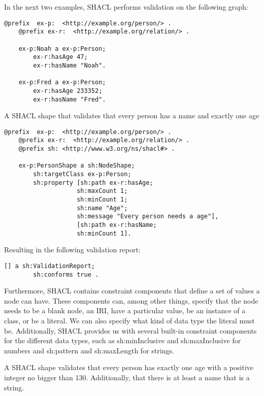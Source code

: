 \para
In the next two examples, SHACL performs validation on the following graph:
\begin{lstlisting}[frame=single, language=turtle, frame=none]
    @prefix  ex-p:  <http://example.org/person/> . 
    @prefix ex-r:  <http://example.org/relation/> . 

    ex-p:Noah a ex-p:Person;
        ex-r:hasAge 47;
        ex-r:hasName "Noah".

    ex-p:Fred a ex-p:Person;
        ex-r:hasAge 233352;
        ex-r:hasName "Fred".
\end{lstlisting}

\begin{example}
A SHACL shape that validates that every person has a name and exactly one age
\end{example}

\begin{lstlisting}[frame=single, language=turtle, frame=none]
    @prefix  ex-p:  <http://example.org/person/> . 
    @prefix ex-r:  <http://example.org/relation/> . 
    @prefix sh:	<http://www.w3.org/ns/shacl#> .

    ex-p:PersonShape a sh:NodeShape;
        sh:targetClass ex-p:Person;
        sh:property [sh:path ex-r:hasAge; 
                    sh:maxCount 1;
                    sh:minCount 1;
                    sh:name "Age";
                    sh:message "Every person needs a age"],
                    [sh:path ex-r:hasName;
                    sh:minCount 1].
\end{lstlisting}
Resulting in the following validation report:
\begin{lstlisting}[frame=single, language=turtle, frame=none]
    [] a sh:ValidationReport;
        sh:conforms true .
\end{lstlisting}

\para
Furthermore, SHACL contains constraint components that define a set of values a node can have. These components can, among other things, specify that the node needs to be a blank node, an IRI, have a particular value, be an instance of a class, or be a literal. We can also specify what kind of data type the literal must be. Additionally, SHACL provides us with several built-in constraint components for the different data types, such as sh:minInclusive and sh:maxInclusive for numbers and  sh:pattern and sh:maxLength for strings.

\begin{example}
A SHACL shape validates that every person has exactly one age with a positive integer no bigger than 130.  Additionally,  that there is at least a name that is a string.
\end{example}

